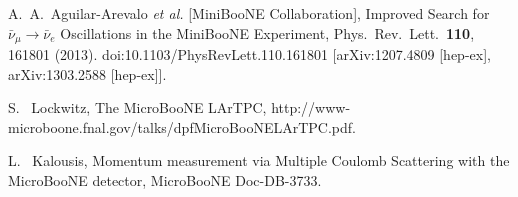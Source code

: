\begin{thebibliography}{1}

  

 
  


  
  A.~A.~Aguilar-Arevalo {\it et al.} 
  [MiniBooNE Collaboration],
  Improved Search for $\bar \nu_\mu \rightarrow \bar \nu_e$ Oscillations in the MiniBooNE Experiment,
  Phys.\ Rev.\ Lett.\  {\bf 110}, 161801 (2013).
  doi:10.1103/PhysRevLett.110.161801
  [arXiv:1207.4809 [hep-ex], arXiv:1303.2588 [hep-ex]].
  
  S. ~Lockwitz, 
  The MicroBooNE LArTPC,
  http://www-microboone.fnal.gov/talks/dpfMicroBooNELArTPC.pdf.
  
  L. ~Kalousis, 
  Momentum measurement via Multiple Coulomb
Scattering with the MicroBooNE detector, 
  MicroBooNE Doc-DB-3733.
  

\end{thebibliography}
